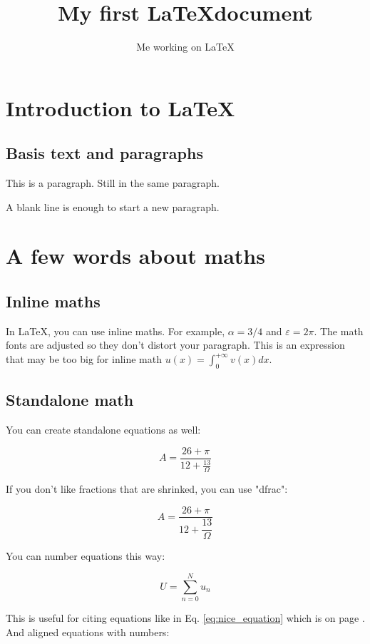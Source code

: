 \documentclass[a4paper]{article}
\title{My first \LaTeX document}
\author{Me working on \LaTeX}
\numberwithin{equation}{section} %
\begin{document}
\maketitle %

\tableofcontents

\section{Introduction to \LaTeX}
\subsection{Basis text and paragraphs}

This is a paragraph.
Still in the same paragraph.
\blindtext

A blank line is enough to start a new paragraph.
\blindtext

\section{A few words about maths}
\subsection{Inline maths}

In \LaTeX, you can use inline maths. For example, $\alpha = 3/4$ and $\varepsilon = 2 \pi$.
The math fonts are adjusted so they don't distort your paragraph.
This is an expression that may be too big for inline math $u(x) = \int_0^{+\infty} v(x) dx$.

\subsection{Standalone math}

You can create standalone equations as well:

$$
    A = \frac{26 + \pi }{12 + \frac{13}{\Omega}}
$$

If you don't like fractions that are shrinked, you can use "dfrac":

$$
    A = \dfrac{26 + \pi }{12 + \dfrac{13}{\Omega}}
$$

You can number equations this way:

\begin{equation}
    U = \sum_{n = 0}^N u_n
    \label{eq:nice_equation}
\end{equation}

This is useful for citing equations like in Eq. \ref{eq:nice_equation} which is on page \pageref{eq:nice_equation}.
And aligned equations with numbers:
\end{document}
